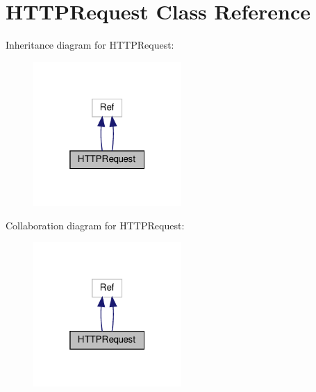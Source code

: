 \hypertarget{classHTTPRequest}{}\section{H\+T\+T\+P\+Request Class Reference}
\label{classHTTPRequest}


Inheritance diagram for H\+T\+T\+P\+Request\+:
\nopagebreak
\begin{figure}[H]
\begin{center}
\leavevmode
\includegraphics[width=160pt]{classHTTPRequest__inherit__graph}
\end{center}
\end{figure}


Collaboration diagram for H\+T\+T\+P\+Request\+:
\nopagebreak
\begin{figure}[H]
\begin{center}
\leavevmode
\includegraphics[width=160pt]{classHTTPRequest__coll__graph}
\end{center}
\end{figure}
